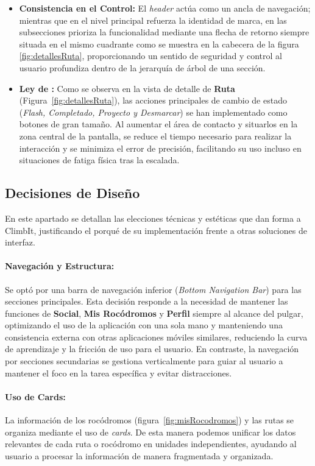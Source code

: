 \begin{itemize}
    \item \textbf{Consistencia en el Control:} El \textit{header} actúa como un ancla de navegación; mientras que en el nivel principal refuerza la identidad de marca, en las subsecciones prioriza la funcionalidad mediante una flecha de retorno siempre situada en el mismo cuadrante como se muestra en la cabecera de la figura \ref{fig:detallesRuta}, proporcionando un sentido de seguridad y control al usuario profundiza dentro de la jerarquía de árbol de una sección.
     
    \item \textbf{Ley de \cite{fitts1954information}:} Como se observa en la vista de detalle de \textbf{Ruta} (Figura~\ref{fig:detallesRuta}), las acciones principales de cambio de estado (\textit{Flash, Completado, Proyecto y Desmarcar}) se han implementado como botones de gran tamaño. Al aumentar el área de contacto y situarlos en la zona central de la pantalla, se reduce el tiempo necesario para realizar la interacción y se minimiza el error de precisión, facilitando su uso incluso en situaciones de fatiga física tras la escalada.
\end{itemize}

\subsection{Decisiones de Diseño}

En este apartado se detallan las elecciones técnicas y estéticas que dan forma a ClimbIt, justificando el porqué de su implementación frente a otras soluciones de interfaz.

\paragraph{Navegación y Estructura:} Se optó por una barra de navegación inferior (\textit{Bottom Navigation Bar}) para las secciones principales. Esta decisión responde a la necesidad de mantener las funciones de \textbf{Social}, \textbf{Mis Rocódromos} y \textbf{Perfil} siempre al alcance del pulgar, optimizando el uso de la aplicación con una sola mano y manteniendo una consistencia externa con otras aplicaciones móviles similares, reduciendo la curva de aprendizaje y la fricción de uso para el usuario. En contraste, la navegación por secciones secundarias se gestiona verticalmente para guiar al usuario a mantener el foco en la tarea específica y evitar distracciones.

\paragraph{Uso de Cards:} La información de los rocódromos (figura~\ref{fig:misRocodromos}) y las rutas se organiza mediante el uso de \textit{cards}. De esta manera podemos unificar los datos relevantes de cada ruta o rocódromo en unidades independientes, ayudando al usuario a procesar la información de manera fragmentada y organizada.

